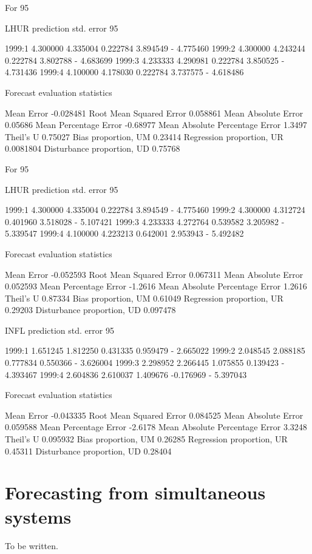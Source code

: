 \begin{code}
 For 95%

               LHUR    prediction    std. error        95%

1999:1     4.300000     4.335004     0.222784     3.894549 - 4.775460
1999:2     4.300000     4.243244     0.222784     3.802788 - 4.683699
1999:3     4.233333     4.290981     0.222784     3.850525 - 4.731436
1999:4     4.100000     4.178030     0.222784     3.737575 - 4.618486

  Forecast evaluation statistics

  Mean Error                       -0.028481
  Root Mean Squared Error           0.058861
  Mean Absolute Error               0.05686
  Mean Percentage Error            -0.68977
  Mean Absolute Percentage Error    1.3497
  Theil's U                         0.75027
  Bias proportion, UM               0.23414
  Regression proportion, UR         0.0081804
  Disturbance proportion, UD        0.75768


 For 95%

               LHUR    prediction    std. error        95%

1999:1     4.300000     4.335004     0.222784     3.894549 - 4.775460
1999:2     4.300000     4.312724     0.401960     3.518028 - 5.107421
1999:3     4.233333     4.272764     0.539582     3.205982 - 5.339547
1999:4     4.100000     4.223213     0.642001     2.953943 - 5.492482

  Forecast evaluation statistics

  Mean Error                       -0.052593
  Root Mean Squared Error           0.067311
  Mean Absolute Error               0.052593
  Mean Percentage Error            -1.2616
  Mean Absolute Percentage Error    1.2616
  Theil's U                         0.87334
  Bias proportion, UM               0.61049
  Regression proportion, UR         0.29203
  Disturbance proportion, UD        0.097478

               INFL    prediction    std. error        95%

1999:1     1.651245     1.812250     0.431335     0.959479 - 2.665022
1999:2     2.048545     2.088185     0.777834     0.550366 - 3.626004
1999:3     2.298952     2.266445     1.075855     0.139423 - 4.393467
1999:4     2.604836     2.610037     1.409676    -0.176969 - 5.397043

  Forecast evaluation statistics

  Mean Error                       -0.043335
  Root Mean Squared Error           0.084525
  Mean Absolute Error               0.059588
  Mean Percentage Error            -2.6178
  Mean Absolute Percentage Error    3.3248
  Theil's U                         0.095932
  Bias proportion, UM               0.26285
  Regression proportion, UR         0.45311
  Disturbance proportion, UD        0.28404
\end{code}

\section{Forecasting from simultaneous systems}
\label{sec:fcast-system}

To be written.

    
